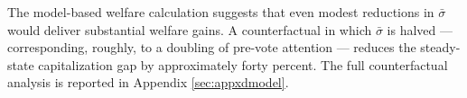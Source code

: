 The model-based welfare calculation suggests that even modest reductions in $\bar{\sigma}$ would deliver substantial welfare gains. A counterfactual in which $\bar{\sigma}$ is halved --- corresponding, roughly, to a doubling of pre-vote attention --- reduces the steady-state capitalization gap by approximately forty percent. The full counterfactual analysis is reported in Appendix \ref{sec:appxdmodel}.

